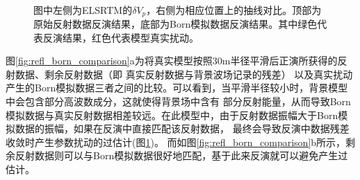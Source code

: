 \begin{figure}[!htb]
   \centering
   \\
   \caption{图中左侧为ELSRTM的$\delta
	   V_p$，右侧为相应位置上的抽线对比。顶部为原始反射数据反演结果，底部为Born模拟数据反演结果。其中绿色代表反演结果，红色代表模型真实扰动。}
   \label{fig:Vpcomparison}
\end{figure}

图\ref{fig:refl_born_comparison}a为将真实模型按照30m半径平滑后正演所获得的反射数据、剩余反射数据（即
真实反射数据与背景波场记录的残差）
以及真实扰动产生的Born模拟数据三者之间的比较。可以看到，当平滑半径较小时，背景模型中会包含部分高波数成分，这就使得背景场中含有
部分反射能量，从而导致Born模拟数据与真实反射数据相差较远。在此模型中，由于反射数据振幅大于Born模拟数据的振幅，如果在反演中直接匹配该反射数据，
最终会导致反演中数据残差收敛时产生参数扰动的过估计(图\ref{fig:Vpcomparison})。
而如图\ref{fig:refl_born_comparison}b所示，剩余反射数据则可以与Born模拟数据很好地匹配，基于此来反演就可以避免产生过估计。

